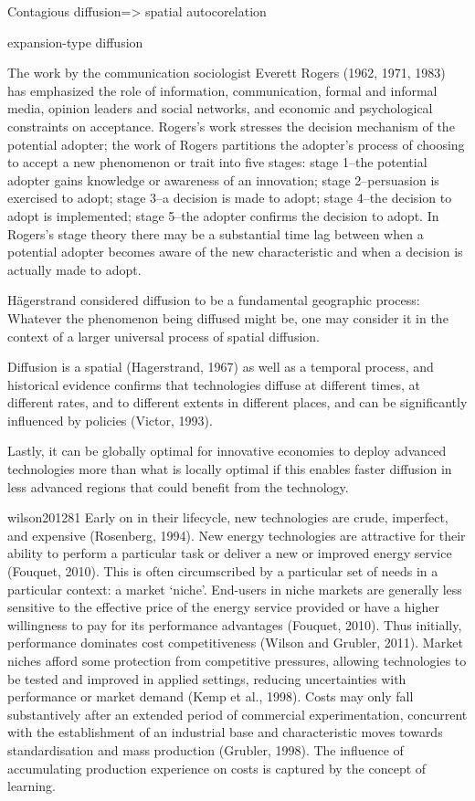 \documentclass[
  authoryear,
  preprint,
  3p]{elsarticle}
\begin{document}
Contagious diffusion=\textgreater{} spatial autocorelation

expansion-type diffusion

The work by the communication sociologist Everett Rogers (1962, 1971,
1983) has emphasized the role of information, communication, formal and
informal media, opinion leaders and social networks, and economic and
psychological constraints on acceptance. Rogers's work stresses the
decision mechanism of the potential adopter; the work of Rogers
partitions the adopter's process of choosing to accept a new phenomenon
or trait into five stages: stage 1--the potential adopter gains
knowledge or awareness of an innovation; stage 2--persuasion is
exercised to adopt; stage 3--a decision is made to adopt; stage 4--the
decision to adopt is implemented; stage 5--the adopter confirms the
decision to adopt. In Rogers's stage theory there may be a substantial
time lag between when a potential adopter becomes aware of the new
characteristic and when a decision is actually made to adopt.

Hägerstrand considered diffusion to be a fundamental geographic process:
Whatever the phenomenon being diffused might be, one may consider it in
the context of a larger universal process of spatial diffusion.

\citet{leibowicz2016representing} Diffusion is a spatial (Hagerstrand,
1967) as well as a temporal process, and historical evidence confirms
that technologies diffuse at different times, at different rates, and to
different extents in different places, and can be significantly
influenced by policies (Victor, 1993).

Lastly, it can be globally optimal for innovative economies to deploy
advanced technologies more than what is locally optimal if this enables
faster diffusion in less advanced regions that could benefit from the
technology.

wilson201281 Early on in their lifecycle, new technologies are crude,
imperfect, and expensive (Rosenberg, 1994). New energy technologies are
attractive for their ability to perform a particular task or deliver a
new or improved energy service (Fouquet, 2010). This is often
circumscribed by a particular set of needs in a particular context: a
market `niche'. End-users in niche markets are generally less sensitive
to the effective price of the energy service provided or have a higher
willingness to pay for its performance advantages (Fouquet, 2010). Thus
initially, performance dominates cost competitiveness (Wilson and
Grubler, 2011). Market niches afford some protection from competitive
pressures, allowing technologies to be tested and improved in applied
settings, reducing uncertainties with performance or market demand (Kemp
et al., 1998). Costs may only fall substantively after an extended
period of commercial experimentation, concurrent with the establishment
of an industrial base and characteristic moves towards standardisation
and mass production (Grubler, 1998). The influence of accumulating
production experience on costs is captured by the concept of learning.
\end{document}
